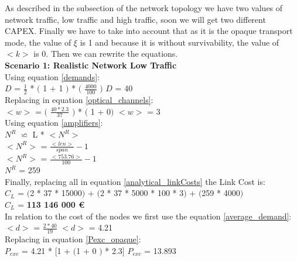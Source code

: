 As described in the subsection of the network topology we have two values of network traffic, low traffic and high traffic, soon we will get two different CAPEX. Finally we have to take into account that as it is the opaque transport mode, the value of $\xi$ is 1 and because it is without survivability, the value of $<k>$ is 0. Then we can rewrite the equations.\\

\textbf{Scenario 1: Realistic Network Low Traffic}\\

Using equation \ref{demands}:\\

$D$ = $\frac{1}{2}$ * $($ 1 + 1 $)$ * $($ $\frac{4000}{100}$ $)$ \qquad \qquad $D$ = 40\\

Replacing in equation \ref{optical_channels}:\\

$<w>$ = $($ $\frac{40 * 2.3}{37}$ $)$ * $($ 1 + 0$)$ \qquad \qquad $<w>$ = 3\\

Using equation \ref{amplifiers}:\\

$N^R$ $\backsimeq$ L * $<N^R>$ \\

$<N^R>$ = $\frac{<len>}{span}-1$\\

$<N^R>$ = $\frac{<753.76>}{100}-1$\\

$N^R$ = 259\\

Finally, replacing all in equation \ref{analytical_linkCosts} the Link Cost is:\\

$C_L$ = $($2 * 37 * 15000$)$ + $($2 * 37 * 5000 * 100 * 3$)$ + $($259 * 4000$)$\\

$C_L$ = \textbf{113 146 000 \euro}\\

In relation to the cost of the nodes we first use the equation \ref{average_demand}:\\

$<d>$ = $\frac{2 * 40}{19}$ \qquad \qquad $<d>$ = 4.21\\

Replacing in equation \ref{Pexc_opaque}:\\

$P_{exc}$ = 4.21 * $[$1 + $($1 + $0$ $)$ * 2.3$]$ \qquad \quad $P_{exc}$ = 13.893 \\

